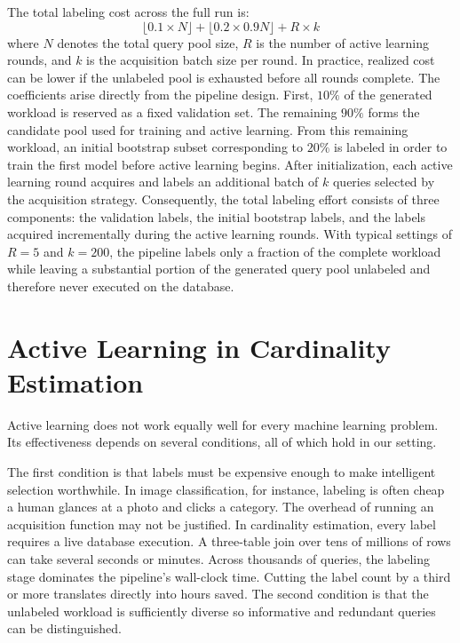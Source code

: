 The total labeling cost across the full run is:
\[
\lfloor 0.1 \times N \rfloor + \lfloor 0.2 \times 0.9N \rfloor + R \times k
\]
where $N$ denotes the total query pool size, $R$ is the number of active learning rounds, and $k$ is the acquisition batch size per round. In practice, realized cost can be lower if the unlabeled pool is exhausted before all rounds complete. The coefficients arise directly from the pipeline design. First, \(10\%\) of the generated workload is reserved as a fixed validation set. The remaining \(90\%\) forms the candidate pool used for training and active learning. From this remaining workload, an initial bootstrap subset corresponding to \(20\%\) is labeled in order to train the first model before active learning begins. After initialization, each active learning round acquires and labels an additional batch of \(k\) queries selected by the acquisition strategy. Consequently, the total labeling effort consists of three components: the validation labels, the initial bootstrap labels, and the labels acquired incrementally during the active learning rounds. With typical settings of \(R = 5\) and \(k = 200\), the pipeline labels only a fraction of the complete workload while leaving a substantial portion of the generated query pool unlabeled and therefore never executed on the database.

\section{Active Learning in Cardinality Estimation}

Active learning does not work equally well for every machine learning problem. Its effectiveness depends on several conditions, all of which hold in our setting.

The first condition is that labels must be expensive enough to make intelligent selection worthwhile. In image classification, for instance, labeling is often cheap a human glances at a photo and clicks a category. The overhead of running an acquisition function may not be justified. In cardinality estimation, every label requires a live database execution. A three-table join over tens of millions of rows can take several seconds or minutes. Across thousands of queries, the labeling stage dominates the pipeline's wall-clock time. Cutting the label count by a third or more translates directly into hours saved. The second condition is that the unlabeled workload is sufficiently diverse so informative and redundant queries can be distinguished.

